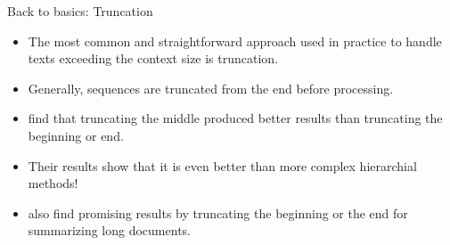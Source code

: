 \begin{frame}{Back to basics: Truncation}

\begin{itemize}
	\item The most common and straightforward approach used in practice to handle texts
	exceeding the context size is truncation.
	\item<2-> Generally, sequences are truncated from the end before processing.
	\item<3-> \citet{sun2019fine} find that truncating the middle produced better results
	than truncating the beginning or end.
	\item<4-> Their results show that it is even better than more complex hierarchial
	methods!
	\item<5> \citet{worsham-kalita-2018-genre} also find promising results by truncating
	the beginning or the end for summarizing long documents.
\end{itemize}

\end{frame}

